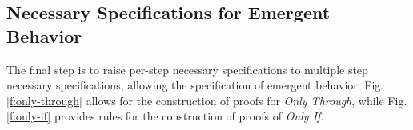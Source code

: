 %
\subsection{Necessary Specifications for Emergent Behavior}
\label{s:emergent-proof}

The final step is to raise per-step necessary specifications to 
multiple step necessary specifications, allowing the specification
of emergent behavior. Fig. \ref{f:only-through} allows for the 
construction of proofs for \emph{Only Through}, while Fig. \ref{f:only-if}
provides rules for the construction of proofs of \emph{Only If}.

